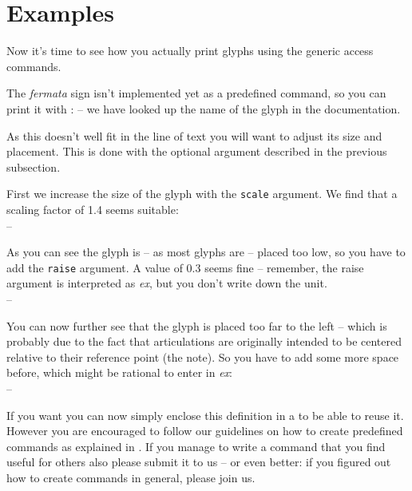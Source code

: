 \documentclass{OLLbook}
\begin{document}
\section{Examples}
\label{sec:examples}
Now it's time to see how you actually print \emmentaler glyphs using the generic access commands.

The \emph{fermata} sign isn't implemented yet as a predefined command, so you can print it with :  -- we have looked up the name of the glyph in the documentation.
 
As this doesn't well fit in the line of text you will want to adjust its size and placement.
This is done with the optional argument described in the previous subsection.

First we increase the size of the glyph with the \texttt{scale} argument. We find that a scaling factor of 1.4 seems suitable:\\
 -- 

As you can see the glyph is -- as most \emmentaler glyphs are -- placed too low, so you have to add the \texttt{raise} argument. A value of 0.3 seems fine -- remember, the raise argument is interpreted as \emph{ex}, but you don't write down the unit.\\
  -- 
 
You can now further see that the glyph is placed too far to the left -- which is probably due to the fact that articulations are originally intended to be centered relative to their reference point (the note).
So you have to add some more space before, which might be rational to enter in \emph{ex}:\\
 -- \hspace{1ex}

\medskip
If you want you can now simply enclose this definition in a   to be able to reuse it.
However you are encouraged to follow our guidelines on how to create predefined commands as explained in .
If you manage to write a command that you find useful for others also please submit it to us -- or even better: if you figured out how to create commands in general, please join us.
\end{document}
